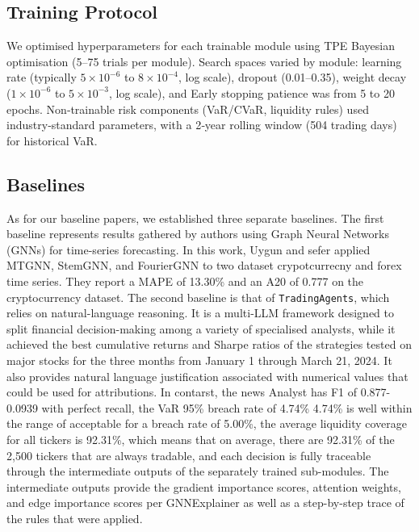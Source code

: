 \documentclass[conference]{IEEEtran}
\begin{document}
\subsection{Training Protocol}
 
We optimised hyperparameters for each trainable module using TPE Bayesian optimisation (5–75 trials per module).   Search spaces varied by module: learning rate (typically $5\times10^{-6}$ to $8\times10^{-4}$, log scale), dropout (0.01–0.35), weight decay ($1\times10^{-6}$ to $5\times10^{-3}$, log scale), and  Early stopping patience was from 5 to 20 epochs. Non‑trainable risk components (VaR/CVaR, liquidity rules) used industry‑standard parameters, with a 2‑year rolling window (504 trading days) for historical VaR. 
\subsection{Baselines}
As for our baseline papers, we established three separate baselines. The first baseline represents results gathered by authors using Graph Neural Networks (GNNs) for time-series forecasting.\cite{13thPaper}  In this work, Uygun and sefer applied MTGNN\cite{MTGNN}, StemGNN\cite{StemGNN}, and FourierGNN\cite{FourierGNN} to two dataset crypotcurrecny and forex time series. They report a MAPE of 13.30\% and an A20 of 0.777 on the cryptocurrency dataset. The second baseline is that of \texttt{TradingAgents}, which relies on natural-language reasoning. It is a multi-LLM framework designed to split financial decision-making among a variety of specialised analysts, while it achieved the best cumulative returns and Sharpe ratios of the strategies tested on major stocks for the three months from January 1 through March 21, 2024.  It also provides natural language justification associated with numerical values that could be used for attributions. In contarst, the news Analyst has F1 of 0.877-0.0939 with perfect recall, the VaR 95\% breach rate of 4.74\% 4.74\% is well within the range of acceptable for a breach rate of 5.00\%, the average liquidity coverage for all tickers is 92.31\%, which means that on average, there are 92.31\% of the 2,500 tickers that are always tradable, and each decision is fully traceable through the intermediate outputs of the separately trained sub-modules. The intermediate outputs provide the gradient importance scores, attention weights, and edge importance scores per GNNExplainer as well as a step-by-step trace of the rules that were applied.
\end{document}
